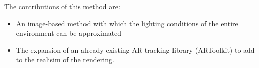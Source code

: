 The contributions of this method are:
\begin{itemize}
    \item An image-based method with which the lighting conditions of the entire environment can be approximated
    \item The expansion of an already existing AR tracking library (ARToolkit) to add to the realisim of the rendering.
\end{itemize}